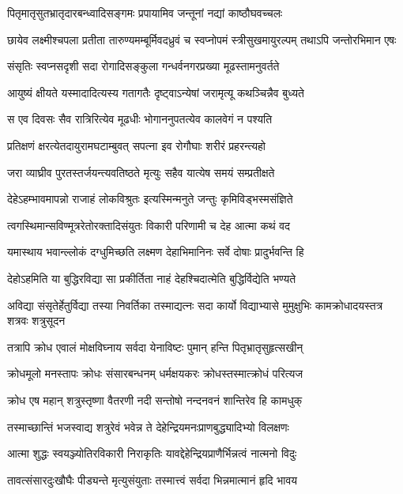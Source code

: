 \twolineshloka
{पितृमातृसुतभ्रातृदारबन्ध्वादिसङ्गमः}
{प्रपायामिव जन्तूनां नद्यां काष्ठौघवच्चलः} %

\fourlineindentedshloka
{छायेव लक्ष्मीश्चपला प्रतीता}
{तारुण्यमम्बूर्मिवदध्रुवं च}
{स्वप्नोपमं स्त्रीसुखमायुरल्पम्}
{तथाऽपि जन्तोरभिमान एषः} %

\twolineshloka
{संसृतिः स्वप्नसदृशी सदा रोगादिसङ्कुला}
{गन्धर्वनगरप्रख्या मूढस्तामनुवर्तते} %

\twolineshloka
{आयुष्यं क्षीयते यस्मादादित्यस्य गतागतैः}
{दृष्ट्वाऽन्येषां जरामृत्यू कथञ्चिन्नैव बुध्यते} %

\twolineshloka
{स एव दिवसः सैव रात्रिरित्येव मूढधीः}
{भोगाननुपतत्येव कालवेगं न पश्यति} %

\twolineshloka
{प्रतिक्षणं क्षरत्येतदायुरामघटाम्बुवत्}
{सपत्ना इव रोगौघाः शरीरं प्रहरन्त्यहो} %

\twolineshloka
{जरा व्याघ्रीव पुरतस्तर्जयन्त्यवतिष्ठते}
{मृत्युः सहैव यात्येष समयं सम्प्रतीक्षते} %

\twolineshloka
{देहेऽहम्भावमापन्नो राजाहं लोकविश्रुतः}
{इत्यस्मिन्मनुते जन्तुः कृमिविड्भस्मसंज्ञिते} %

\twolineshloka
{त्वगस्थिमान्सविण्मूत्ररेतोरक्तादिसंयुतः}
{विकारी परिणामी च देह आत्मा कथं वद} %

\twolineshloka
{यमास्थाय भवान्ल्लोकं दग्धुमिच्छति लक्ष्मण}
{देहाभिमानिनः सर्वे दोषाः प्रादुर्भवन्ति हि} %

\twolineshloka
{देहोऽहमिति या बुद्धिरविद्या सा प्रकीर्तिता}
{नाहं देहश्चिदात्मेति बुद्धिर्विद्येति भण्यते} %

\threelineshloka
{अविद्या संसृतेर्हेतुर्विद्या तस्या निवर्तिका}
{तस्माद्यत्नः सदा कार्यो विद्याभ्यासे मुमुक्षुभिः}
{कामक्रोधादयस्तत्र शत्रवः शत्रुसूदन} %

\twolineshloka
{तत्रापि क्रोध एवालं मोक्षविघ्नाय सर्वदा}
{येनाविष्टः पुमान् हन्ति पितृभ्रातृसुहृत्सखीन्} %

\twolineshloka
{क्रोधमूलो मनस्तापः क्रोधः संसारबन्धनम्}
{धर्मक्षयकरः क्रोधस्तस्मात्क्रोधं परित्यज} %

\twolineshloka
{क्रोध एष महान् शत्रुस्तृष्णा वैतरणी नदी}
{सन्तोषो नन्दनवनं शान्तिरेव हि कामधुक्} %

\twolineshloka
{तस्माच्छान्तिं भजस्वाद्य शत्रुरेवं भवेन्न ते}
{देहेन्द्रियमनःप्राणबुद्ध्यादिभ्यो विलक्षणः} %

\twolineshloka
{आत्मा शुद्धः स्वयञ्ज्योतिरविकारी निराकृतिः}
{यावद्देहेन्द्रियप्राणैर्भिन्नत्वं नात्मनो विदुः} %

\twolineshloka
{तावत्संसारदुःखौघैः पीड्यन्ते मृत्युसंयुताः}
{तस्मात्त्वं सर्वदा भिन्नमात्मानं हृदि भावय} %

